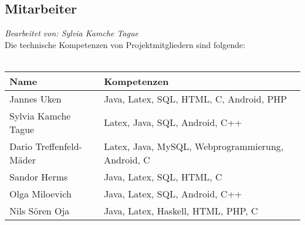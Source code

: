 \subsection{Mitarbeiter}
\textit{Bearbeitet von: Sylvia Kamche Tague }\\
Die technische Kompetenzen von Projektmitgliedern sind folgende:\\
\\
\begin{tabular}{l|l}
Name & Kompetenzen\\
\hline

Jannes Uken & Java, Latex, SQL, HTML, C, Android, PHP\\
Sylvia Kamche Tague & Latex, Java, SQL,  Android, C++\\
Dario Treffenfeld-Mäder & Latex, Java, MySQL, Webprogrammierung, Android, C \\
Sandor Herms & Java, Latex, SQL, HTML, C\\
Olga Miloevich & Java, Latex, SQL, Android, C++\\
Nils Sören Oja & Java, Latex, Haskell, HTML, PHP, C\\

\end{tabular}